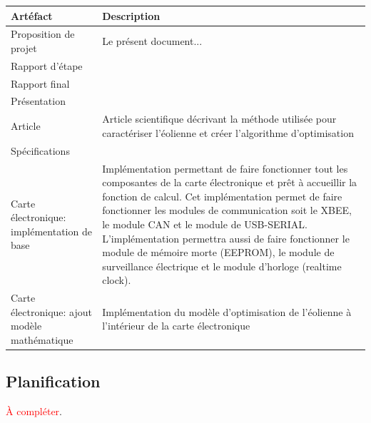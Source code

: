 \documentclass[11pt]{article}
\begin{document}
\begin{tabu} to \linewidth {X[1,l]X[2,l]}
  \bfseries Artéfact & Description \\ \hline
  Proposition de projet & Le présent document...\\
  Rapport d'étape \\
  Rapport final \\
  Présentation \\
  Article & Article scientifique décrivant la méthode utilisée pour caractériser l'éolienne et créer l'algorithme d'optimisation\\
  Spécifications \\
  \hline
  Carte électronique: implémentation de base & Implémentation permettant de faire fonctionner tout les composantes de la carte électronique et prêt à accueillir la fonction de calcul. Cet implémentation permet de faire fonctionner les modules de communication soit le XBEE, le module CAN et le module de USB-SERIAL. L'implémentation permettra aussi de faire fonctionner le module de mémoire morte (EEPROM), le module de surveillance électrique et le module d'horloge (realtime clock).\\
  Carte électronique: ajout modèle mathématique & Implémentation du modèle d'optimisation de l'éolienne à l'intérieur de la carte électronique\\

\end{tabu}
\subsection{Planification}


\textcolor{red}{À compléter}.
\end{document}
